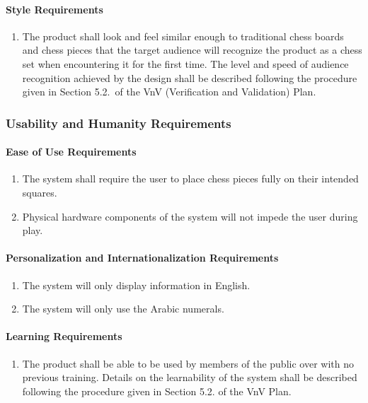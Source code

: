 \documentclass[12pt]{article}
\begin{document}
{\paragraph{Style Requirements}
\begin{enumerate}[{LF}1., leftmargin=2\parindent, resume]
    \item The product shall look and feel similar enough to traditional chess boards and chess pieces that the target audience will 
    recognize the product as a chess set when encountering it for the first time. The level and speed of audience recognition achieved 
    by the design shall be described following the procedure given in Section 5.2.\thevnvSectionNfr{}~of the VnV 
    (Verification and Validation) Plan.
\end{enumerate}



\subsubsection{Usability and Humanity Requirements}
\label{NFR_UH}
\paragraph{Ease of Use Requirements}
\begin{enumerate}[{UH}1., leftmargin=2\parindent]
    \item The system shall require the user to place chess pieces fully on their intended squares.
    \item Physical hardware components of the system will not impede the user during play.
\end{enumerate}

\paragraph{Personalization and Internationalization Requirements}
\begin{enumerate}[{UH}1., leftmargin=2\parindent, resume]
    \item The system will only display information in English.
    \item The system will only use the Arabic numerals.
\end{enumerate}

\paragraph{Learning Requirements}
\begin{enumerate}[{UH}1., leftmargin=2\parindent, resume]
    \item The product shall be able to be used by members of the public over with no previous training. Details on the learnability 
    of the system shall be described following the procedure given in Section 5.2.\thevnvSectionNfr{}
    of the VnV Plan.
\end{enumerate}

}
\end{document}
